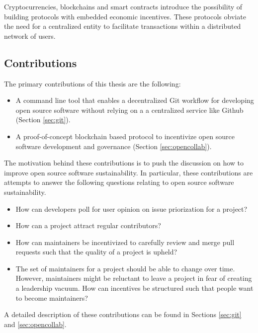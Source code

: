 Cryptocurrencies, blockchains and smart contracts introduce the possibility of building protocols
with embedded economic incentives. These protocols obviate the need for a
centralized entity to facilitate transactions within a distributed network of
users.

\subsection{Contributions}

The primary contributions of this thesis are the following:

\begin{itemize}
  \item A command line tool that enables a decentralized Git workflow for
    developing open source software without relying on a a centralized service
    like Github (Section \ref{sec:git}).
  \item A proof-of-concept blockchain based protocol to incentivize open source
    software development and governance (Section \ref{sec:opencollab}).
\end{itemize}

The motivation behind these contributions is to push the discussion on how to
improve open source software sustainability. In particular, these contributions are
attempts to answer the following questions relating to open source software sustainability.

\begin{itemize}
  \item How can developers poll for user opinion on issue
    priorization for a project?
  \item How can a project attract regular contributors?
  \item How can maintainers be incentivized to carefully review and merge pull
    requests such that the quality of a project is upheld?
  \item The set of maintainers for a project should be able to change over time.
    However, maintainers might be reluctant to leave a project in fear of
    creating a leadership vacuum. How can incentives be structured such that
    people want to become maintainers?
\end{itemize}

A detailed description of these contributions can be found in Sections
\ref{sec:git} and \ref{sec:opencollab}.

